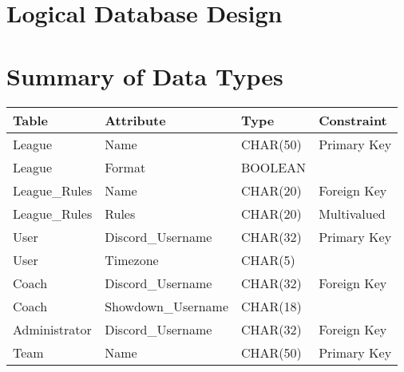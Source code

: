 \documentclass{article}
\begin{document}
\section*{Logical Database Design}
\section*{Summary of Data Types}
\begin{table}[H]
    \large
    \centering
    \begin{tabular}{|l|l|l|l|}
    \hline
    {\color[HTML]{2E3436} \textbf{Table}} & {\color[HTML]{2E3436} \textbf{Attribute}} & {\color[HTML]{2E3436} \textbf{Type}} & {\color[HTML]{2E3436} \textbf{Constraint}} \\ \hline
    {\color[HTML]{2E3436} League} & {\color[HTML]{2E3436} Name} & {\color[HTML]{2E3436} CHAR(50)} & {\color[HTML]{2E3436} Primary Key} \\ \hline
    {\color[HTML]{2E3436} League} & {\color[HTML]{2E3436} Format} & {\color[HTML]{2E3436} BOOLEAN} & {\color[HTML]{2E3436} } \\ \hline
    {\color[HTML]{2E3436} League\_Rules} & {\color[HTML]{2E3436} Name} & {\color[HTML]{2E3436} CHAR(20)} & {\color[HTML]{2E3436} Foreign Key} \\ \hline
    {\color[HTML]{2E3436} League\_Rules} & {\color[HTML]{2E3436} Rules} & {\color[HTML]{2E3436} CHAR(20)} & {\color[HTML]{2E3436} Multivalued} \\ \hline
    {\color[HTML]{2E3436} User} & {\color[HTML]{2E3436} Discord\_Username} & {\color[HTML]{2E3436} CHAR(32)} & {\color[HTML]{2E3436} Primary Key} \\ \hline
    {\color[HTML]{2E3436} User} & {\color[HTML]{2E3436} Timezone} & {\color[HTML]{2E3436} CHAR(5)} & {\color[HTML]{2E3436} } \\ \hline
    {\color[HTML]{2E3436} Coach} & {\color[HTML]{2E3436} Discord\_Username} & {\color[HTML]{2E3436} CHAR(32)} & {\color[HTML]{2E3436} Foreign Key} \\ \hline
    {\color[HTML]{2E3436} Coach} & {\color[HTML]{2E3436} Showdown\_Username} & {\color[HTML]{2E3436} CHAR(18)} & {\color[HTML]{2E3436} } \\ \hline
    {\color[HTML]{2E3436} Administrator} & {\color[HTML]{2E3436} Discord\_Username} & {\color[HTML]{2E3436} CHAR(32)} & {\color[HTML]{2E3436} Foreign Key} \\ \hline
    {\color[HTML]{2E3436} Team} & {\color[HTML]{2E3436} Name} & {\color[HTML]{2E3436} CHAR(50)} & {\color[HTML]{2E3436} Primary Key} \\ \hline

\end{tabular}
\end{table}
\end{document}
